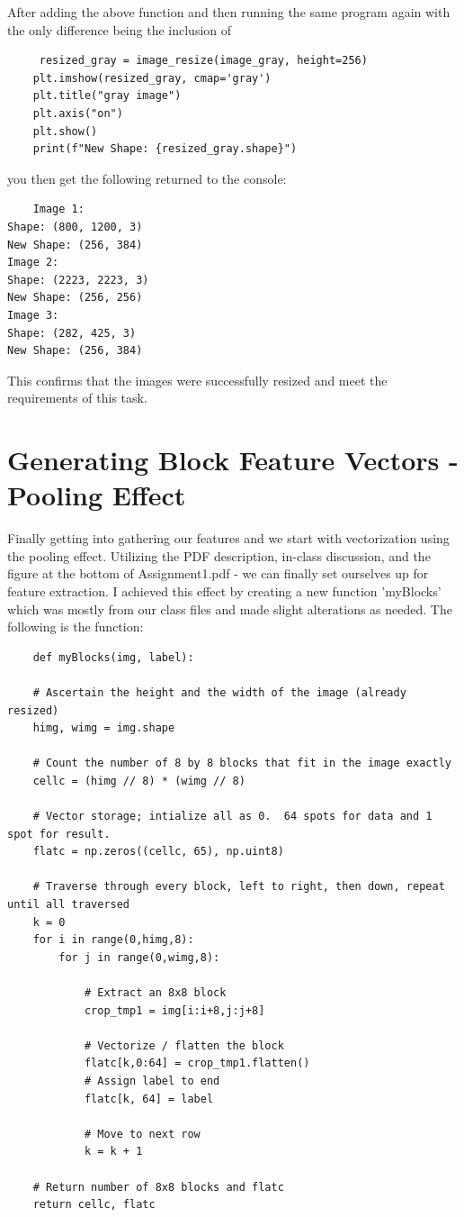 \documentclass[conference]{IEEEtran} %
\begin{document}
After adding the above function and then running the same program again with the only difference being the inclusion of 
\begin{lstlisting}
     resized_gray = image_resize(image_gray, height=256)
    plt.imshow(resized_gray, cmap='gray')
    plt.title("gray image")
    plt.axis("on")
    plt.show()
    print(f"New Shape: {resized_gray.shape}")
\end{lstlisting}
you then get the following returned to the console:
\begin{lstlisting}
    Image 1: 
Shape: (800, 1200, 3)
New Shape: (256, 384)
Image 2: 
Shape: (2223, 2223, 3)
New Shape: (256, 256)
Image 3: 
Shape: (282, 425, 3)
New Shape: (256, 384)
\end{lstlisting}
This confirms that the images were successfully resized and meet the requirements of this task.

\section{Generating Block Feature Vectors - Pooling Effect}
Finally getting into gathering our features and we start with vectorization using the pooling effect.  Utilizing the PDF description, in-class discussion, and the figure at the bottom of Assignment1.pdf - we can finally set ourselves up for feature extraction.  I achieved this effect by creating a new function 'myBlocks' which was mostly from our class files and made slight alterations as needed.  The following is the function:
\begin{lstlisting}
    def myBlocks(img, label):
    
    # Ascertain the height and the width of the image (already resized)
    himg, wimg = img.shape
    
    # Count the number of 8 by 8 blocks that fit in the image exactly
    cellc = (himg // 8) * (wimg // 8)
    
    # Vector storage; intialize all as 0.  64 spots for data and 1 spot for result.
    flatc = np.zeros((cellc, 65), np.uint8)
    
    # Traverse through every block, left to right, then down, repeat until all traversed
    k = 0
    for i in range(0,himg,8):
        for j in range(0,wimg,8):
            
            # Extract an 8x8 block
            crop_tmp1 = img[i:i+8,j:j+8]
            
            # Vectorize / flatten the block
            flatc[k,0:64] = crop_tmp1.flatten()
            # Assign label to end
            flatc[k, 64] = label 
            
            # Move to next row
            k = k + 1
            
    # Return number of 8x8 blocks and flatc
    return cellc, flatc
\end{lstlisting}
\end{document}
